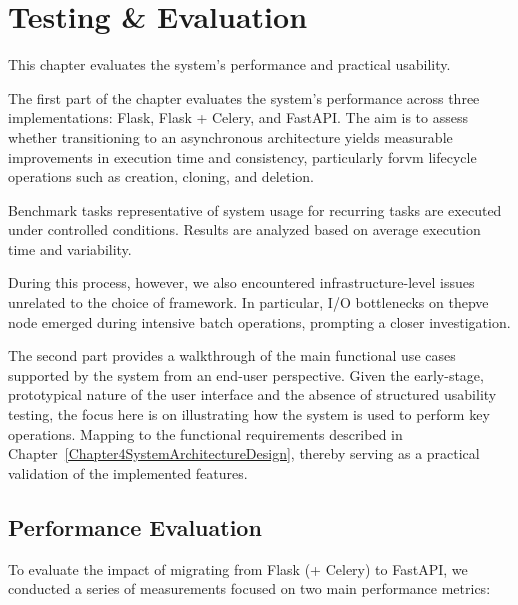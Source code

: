 
\chapter{Testing \& Evaluation}


\label{Chapter6TestingEvaluation}

This chapter evaluates the system's performance and practical usability.

The first part of the chapter  evaluates the system's performance across three implementations: Flask, Flask + Celery, 
and FastAPI. The aim is to assess whether transitioning to an asynchronous architecture yields measurable improvements in 
execution time and consistency, particularly for\ac{vm} lifecycle operations such as creation, cloning, and deletion.

Benchmark tasks representative of system usage for recurring tasks are executed under controlled conditions. Results are analyzed 
based on average execution time and variability.

During this process, however, we also encountered infrastructure-level issues unrelated to the choice of framework. In particular, 
I/O bottlenecks on the\ac{pve} node emerged during intensive batch operations, prompting a closer investigation.

The second part provides a walkthrough of the main functional use cases supported by the system from an end-user perspective. 
Given the early-stage, prototypical nature of the user interface and the absence of structured usability testing, the focus here 
is on illustrating how the system is used to perform key operations. Mapping to the functional requirements described in 
Chapter~\ref{Chapter4SystemArchitectureDesign}, thereby serving as a practical validation of the implemented features.


\section{Performance Evaluation}

    To evaluate the impact of migrating from Flask (+ Celery) to FastAPI, we conducted a series of measurements 
    focused on two main performance metrics:

